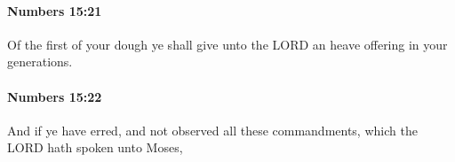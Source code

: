 		\paragraph{Numbers 15:21} %
			\label{NUMBERS-15-21}

			Of the first of your dough ye shall give unto the LORD an heave offering in your generations.


		\paragraph{Numbers 15:22} %
			\label{NUMBERS-15-22}

			And if ye have erred, and not observed all these commandments, which the LORD hath spoken unto Moses,


